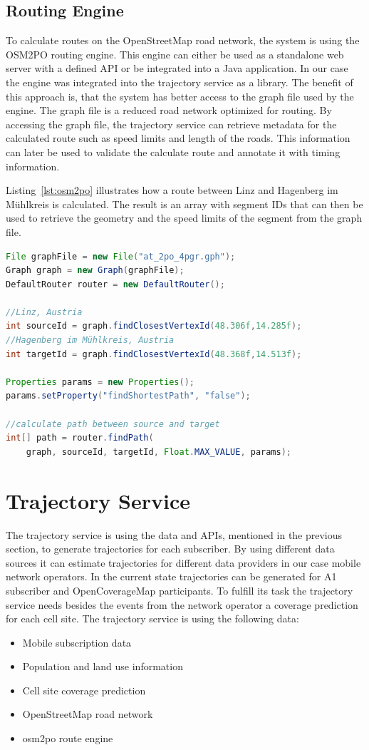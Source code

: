 \subsection{Routing Engine}
To calculate routes on the OpenStreetMap road network, the system is using the OSM2PO routing engine. This engine can either be used as a standalone web server with a defined API or be integrated into a Java application. In our case the engine was integrated into the trajectory service as a library. The benefit of this approach is, that the system has better access to the graph file used by the engine. The graph file is a reduced road network optimized for routing. By accessing the graph file, the trajectory service can retrieve metadata for the calculated route such as speed limits and length of the roads. This information can later be used to validate the calculate route and annotate it with timing information.

Listing~\ref{lst:osm2po} illustrates how a route between Linz and Hagenberg im Mühlkreis is calculated. The result is an array with segment IDs that can then be used to retrieve the geometry and the speed limits of the segment from the graph file.
\begin{lstlisting}[language=Java,style=JAVA,caption={Example code to calculate a route between two points},label={lst:osm2po}]
File graphFile = new File("at_2po_4pgr.gph");
Graph graph = new Graph(graphFile);
DefaultRouter router = new DefaultRouter();

//Linz, Austria
int sourceId = graph.findClosestVertexId(48.306f,14.285f);
//Hagenberg im Mühlkreis, Austria
int targetId = graph.findClosestVertexId(48.368f,14.513f);

Properties params = new Properties();
params.setProperty("findShortestPath", "false");

//calculate path between source and target
int[] path = router.findPath(
    graph, sourceId, targetId, Float.MAX_VALUE, params);
\end{lstlisting}
\section{Trajectory Service}
The trajectory service is using the data and APIs, mentioned in the previous section, to generate trajectories for each subscriber. By using different data sources it can estimate trajectories for different data providers in our case mobile network operators. In the current state trajectories can be generated for A1 subscriber and OpenCoverageMap participants. To fulfill its task the trajectory service needs besides the events from the network operator a coverage prediction for each cell site. The trajectory service is using the following data:
\begin{itemize}
\item Mobile subscription data
\item Population and land use information
\item Cell site coverage prediction
\item OpenStreetMap road network
\item osm2po route engine
\end{itemize}

